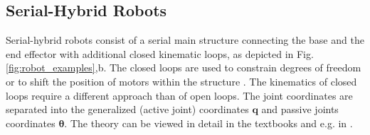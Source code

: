 \documentclass[runningheads]{llncs}
\begin{document}
\subsection{Serial-Hybrid Robots}
\label{sec:fundamentals_hybrid}


Serial-hybrid robots consist of a serial main structure connecting the base and the end effector with additional closed kinematic loops, as depicted in Fig.\,\ref{fig:robot_examples},b.
The closed loops are used to constrain degrees of freedom or to shift the position of motors within the structure \cite{NakamuraGho1989}.
The kinematics of closed loops require a different approach than of open loops.
The joint coordinates are separated into the generalized (active joint) coordinates $\bm{q}$ and passive joints coordinates $\bm{\theta}$.
The theory can be viewed in detail in the textbooks \cite{SaminFis2003,KhalilDom2002} and e.g. in \cite{NakamuraGho1989,KhalilCre1997,ShiMcP2000,FisettePosSasSam2002,Docquier2013}.

\end{document}
